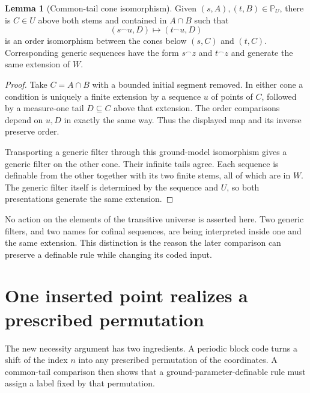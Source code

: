 \documentclass[11pt,letterpaper]{article}
\theoremstyle{definition}
\newtheorem{lemma}[definition]{Lemma}
\numberwithin{equation}{section}
\newcommand{\PP}{\mathbb P}
\newcommand{\concat}{\mathbin{{}^\frown}}
\begin{document}
\begin{lemma}[Common-tail cone isomorphism]\label{lem:cones}
Given $(s,A),(t,B)\in\PP_U$, there is $C\in U$ above both stems and contained in $A\cap B$ such that
\begin{equation}\label{eq:coneiso}
(s\concat u,D)\longmapsto(t\concat u,D)
\end{equation}
is an order isomorphism between the cones below $(s,C)$ and $(t,C)$. Corresponding generic sequences have the form $s\concat z$ and $t\concat z$ and generate the same extension of $W$.
\end{lemma}
\begin{proof}
Take $C=A\cap B$ with a bounded initial segment removed. In either cone a condition is uniquely a finite extension by a sequence $u$ of points of $C$, followed by a measure-one tail $D\subseteq C$ above that extension. The order comparisons depend on $u,D$ in exactly the same way. Thus the displayed map and its inverse preserve order.

Transporting a generic filter through this ground-model isomorphism gives a generic filter on the other cone. Their infinite tails agree. Each sequence is definable from the other together with its two finite stems, all of which are in $W$. The generic filter itself is determined by the sequence and $U$, so both presentations generate the same extension.
\end{proof}

No action on the elements of the transitive universe is asserted here. Two generic filters, and two names for cofinal sequences, are being interpreted inside one and the same extension. This distinction is the reason the later comparison can preserve a definable rule while changing its coded input.

\section{One inserted point realizes a prescribed permutation}\label{sec:insertion}

The new necessity argument has two ingredients. A periodic block code turns a shift of the index $n$ into any prescribed permutation of the coordinates. A common-tail comparison then shows that a ground-parameter-definable rule must assign a label fixed by that permutation.
\end{document}
